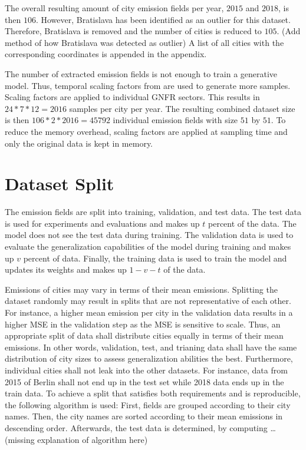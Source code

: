 The overall resulting amount of city emission fields per year, $2015$ and $2018$, is then $106$.
However, Bratislava has been identified as an outlier for this dataset.
Therefore, Bratislava is removed and the number of cities is reduced to $105$.
(Add method of how Bratislava was detected as outlier)
A list of all cities with the corresponding coordinates is appended in the appendix.

The number of extracted emission fields is not enough to train a generative model.
Thus, temporal scaling factors from \parencite{ScalingFactors} are used to generate more samples.
Scaling factors are applied to individual GNFR sectors.
This results in $24 * 7 * 12 = 2016$ samples per city per year.
The resulting combined dataset size is then $106 * 2 * 2016 = 45792$ individual emission fields with size $51$ by $51$.
To reduce the memory overhead, scaling factors are applied at sampling time and only the original data is kept in memory.

\section{Dataset Split}
The emission fields are split into training, validation, and test data.
The test data is used for experiments and evaluations and makes up $t$ percent of the data.
The model does not see the test data during training.
The validation data is used to evaluate the generalization capabilities of the model during training and makes up $v$ percent of data.
Finally, the training data is used to train the model and updates its weights and makes up $1 - v - t$ of the data.

Emissions of cities may vary in terms of their mean emissions.
Splitting the dataset randomly may result in splits that are not representative of each other.
For instance, a higher mean emission per city in the validation data results in a higher MSE in the validation step as the MSE is sensitive to scale.
Thus, an appropriate split of data shall distribute cities equally in terms of their mean emissions.
In other words, validation, test, and trianing data shall have the same distribution of city sizes to assess generalization abilities the best. 
Furthermore, individual cities shall not leak into the other datasets.
For instance, data from 2015 of Berlin shall not end up in the test set while 2018 data ends up in the train data.
To achieve a split that satisfies both requirements and is reproducible, the following algorithm is used:
First, fields are grouped according to their city names.
Then, the city names are sorted according to their mean emissions in descending order.
Afterwards, the test data is determined, by computing \dots (missing explanation of algorithm here)

